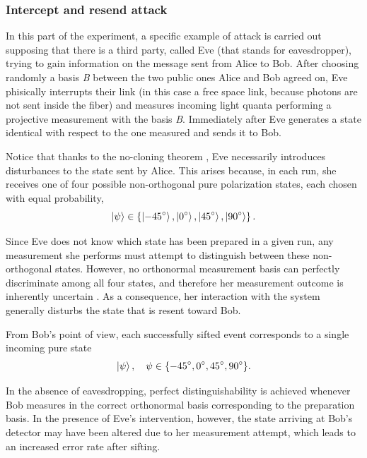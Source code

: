\subsubsection{Intercept and resend attack}

In this part of the experiment, a specific example of attack is
carried out supposing
that there is a third party, called Eve (that stands for
eavesdropper), trying to
gain information
on the message sent from Alice to Bob.
After choosing randomly a
basis \textit{B} between the two public ones Alice and Bob agreed on,
Eve phisically
interrupts their link (in this case a free space link, because photons
are not sent inside
the fiber) and measures
incoming light quanta performing a projective measurement with the
basis \textit{B}.
Immediately after Eve generates a state identical with respect to the
one measured and
sends it to Bob.

Notice that thanks to the no-cloning theorem \cite{Wootters1982ASQ},
Eve necessarily introduces disturbances to the state sent by Alice.
This arises because, in each run, she receives one of four possible
non-orthogonal pure polarization states, each chosen with equal probability,
\begin{equation*}
\ket{\psi} \in \left\{
  \ket{\SI{-45}{\degree}},
  \ket{\SI{0}{\degree}},
  \ket{\SI{45}{\degree}},
  \ket{\SI{90}{\degree}}
\right\}.
\end{equation*}

Since Eve does not know which state has been prepared in a given run,
any measurement she performs must attempt to distinguish between
these non-orthogonal states. However, no orthonormal measurement
basis can perfectly discriminate among all four states, and therefore
her measurement outcome is inherently uncertain
\cite{Nielsen_Chuang_2010}. As a consequence,
her interaction with the system generally disturbs the state that is
resent toward Bob.

From Bob’s point of view, each successfully sifted event corresponds
to a single incoming pure state
\begin{equation*}
\ket{\psi}, \quad \psi \in \{ \SI{-45}{\degree}, \SI{0}{\degree},
\SI{45}{\degree}, \SI{90}{\degree} \}.
\end{equation*}

In the absence of eavesdropping, perfect distinguishability is
achieved whenever Bob measures in the correct orthonormal basis
corresponding to the preparation basis. In the presence of Eve’s
intervention, however, the state arriving at Bob’s detector may have
been altered due to her measurement attempt, which leads to an
increased error rate after sifting.

